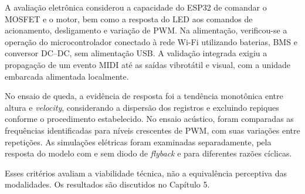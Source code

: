 A avaliação eletrônica considerou a capacidade do ESP32 de comandar o MOSFET e o motor, bem como a resposta do LED aos comandos de acionamento, desligamento e variação de PWM. Na alimentação, verificou-se a operação do microcontrolador conectado à rede Wi-Fi utilizando baterias, BMS e conversor DC--DC, sem alimentação USB. A validação integrada exigiu a propagação de um evento MIDI até as saídas vibrotátil e visual, com a unidade embarcada alimentada localmente.

No ensaio de queda, a evidência de resposta foi a tendência monotônica entre altura e \textit{velocity}, considerando a dispersão dos registros e excluindo repiques conforme o procedimento estabelecido. No ensaio acústico, foram comparadas as frequências identificadas para níveis crescentes de PWM, com suas variações entre repetições. As simulações elétricas foram examinadas separadamente, pela resposta do modelo com e sem diodo de \textit{flyback} e para diferentes razões cíclicas.

Esses critérios avaliam a viabilidade técnica, não a equivalência perceptiva das modalidades. Os resultados são discutidos no Capítulo 5.
